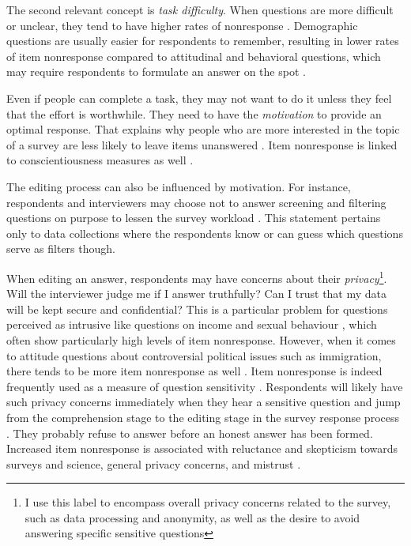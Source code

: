 \documentclass[a4paper,12pt]{article}
\begin{document}
The second relevant concept is \textit{task difficulty}. When questions are more difficult or unclear, they tend to have higher rates of nonresponse \citep{holbrookImpactQuestionRespondent2006, messerDeterminantsItemNonresponse2012, holbrookInterviewerErrorsHelp2016, olsonEffectsRespondentQuestion2019}. Demographic questions are usually easier for respondents to remember, resulting in lower rates of item nonresponse compared to attitudinal and behavioral questions, which may require respondents to formulate an answer on the spot \citep{olsonEffectsRespondentQuestion2019, silberEffectsQuestionRespondent2021}.

Even if people can complete a task, they may not want to do it unless they feel that the effort is worthwhile. They need to have the \textit{motivation} to provide an optimal response. That explains why people who are more interested in the topic of a survey are less likely to leave items unanswered \citep{kochItemNonresponseEuropean2009, silberEffectsQuestionRespondent2021}. Item nonresponse is linked to conscientiousness measures as well \citep{hedengrenDogThatDidn2012}.

The editing process can also be influenced by motivation. For instance, respondents and interviewers may choose not to answer screening and filtering questions on purpose to lessen the survey workload \citep{tourangeauMotivatedMisreportingShaping2015}. This statement pertains only to data collections where the respondents know or can guess which questions serve as filters though.

When editing an answer, respondents may have concerns about their \textit{privacy}\footnote{ I use this label to encompass overall privacy concerns related to the survey, such as data processing and anonymity, as well as the desire to avoid answering specific sensitive questions}. Will the interviewer judge me if I answer truthfully? Can I trust that my data will be kept secure and confidential? This is a particular problem for questions perceived as intrusive \citep{tourangeauSensitiveQuestionsSurveys2007} like questions on income \citep{yanTrendsIncomeNonresponse2010} and sexual behaviour \citep{kupekDeterminantsItemNonresponse1998}, which often show particularly high levels of item nonresponse. However, when it comes to attitude questions about controversial political issues such as immigration, there tends to be more item nonresponse as well \citep{piekutSurveyNonresponseAttitudes2021}. Item nonresponse is indeed frequently used as a measure of question sensitivity \citep{tourangeauSensitiveQuestionsSurveys2007}. Respondents will likely have such privacy concerns immediately when they hear a sensitive question and jump from the comprehension stage to the editing stage in the survey response process \citep{tourangeauPsychologySurveyResponse2000}. They probably refuse to answer before an honest answer has been formed.  Increased item nonresponse is associated with reluctance and skepticism towards surveys and science, general privacy concerns, and mistrust \citep{silberEffectsQuestionRespondent2021}. 
\end{document}
